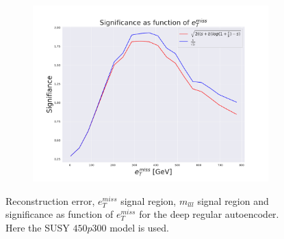 \begin{figure}[H]
    \begin{subfigure}{.60\textwidth}
        \includegraphics[width=\textwidth]{Figures/AE_testing/big/2lep/significance_etmiss_450p0p0300_-1.4360553938127363.pdf}
        \caption{}
        \label{fig:AE_2lep_big_signi_450}
    \end{subfigure}
    \hfill      
    \caption[2lep deep network | $450p300$ | AE]{Reconstruction error, $e_T^{miss}$ signal region, $m_{lll}$ signal region and significance as function of 
    $e_T^{miss}$ for the deep regular autoencoder. Here the SUSY $450p300$ model is used.}
    \label{fig:AE_2lep_big_rec_sig_signi_450}
\end{figure}

